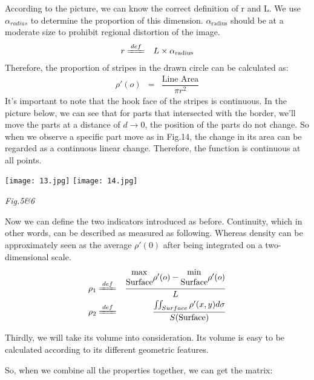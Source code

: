 \documentclass[12pt]{article}
\theoremstyle{definition}
\theoremstyle{remark}
\numberwithin{equation}{section}
\begin{document}
  	According to the picture, we can know the correct definition of r and L. We use $\alpha_{radius}$ to determine the proportion of this dimension. $\alpha_\mathrm{radius}$ should be at a moderate size to prohibit regional distortion of the image.
  	\begin{align}
  		r&\xlongequal{def}&L\times\alpha_\mathrm{radius}
  	\end{align}		
  	Therefore, the proportion of stripes in the drawn circle can be calculated as:
  	\begin{align}
  		\rho'(o)&=&\dfrac{\text{Line Area}}{\pi r^2}
  	\end{align}		
  	It's important to note that the hook face of the stripes is continuous. In the picture below, we can see that for parts that intersected with the border, we'll move the parts at a distance of $d \to 0$, the position of the parts do not change. So when we observe a specific part move as in Fig.14, the change in its area can be regarded as a continuous linear change. Therefore, the function is continuous at all points.
  	
  	\begin{center}
  		\texttt{[image: 13.jpg]}
  		\texttt{[image: 14.jpg]}
  		
  		\textit{Fig.5\&6}
  	\end{center}

  	Now we can define the two indicators  introduced as before. Continuity, which in other words, can be described as measured as following. Whereas density can be approximately seen as the average $\rho'(0)$ after being integrated on a two-dimensional scale.
  	\begin{align}
  		\rho_{1}&\xlongequal{def}&\dfrac{\begin{matrix}\max\\\mathrm{Surface}\end{matrix}\rho'(o)-\begin{matrix}\min\\\mathrm{Surface}\end{matrix}\rho'(o)}{L}\\
  		\rho_{2}&\xlongequal{def}&\dfrac{\iint_{Surface}\rho'(x,y)d\sigma}{S(\mathrm{Surface})}
  	\end{align}
  	
  			
  	Thirdly, we will take its volume into consideration. Its volume is easy to be calculated according to its different geometric features.
  	
	  So, when we combine all the properties together, we can get the matrix:
	  
\end{document}
